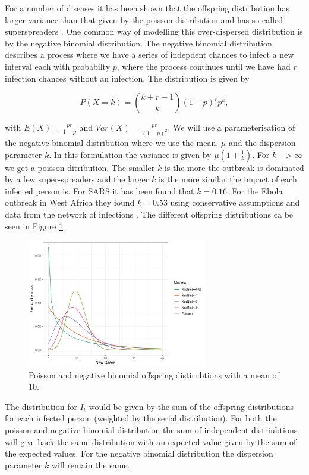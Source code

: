 \documentclass[12pt]{article}
\begin{document}
For a number of diseases it has been shown that the offspring distribution has larger variance than that given by the poisson distribution and has so called superspreaders \cite{lloyd-smithSuperspreadingEffectIndividual2005}. One common way of modelling this over-dispersed distribution is by the negative binomial distribution. The negative binomial distribution describes a process where we have a series of indepdent chances to infect a new interval each with probabilty $p$, where the process continues until we have had $r$ infection chances without an infection. The distribution is given by

\[P(X=k) = {k + r - 1 \choose k} (1-p)^rp^k, \]

with $E(X)=\frac{pr}{1-p}$ and $Var(X) = \frac{pr}{(1-p)^2}$. We will use a parameterisation of the negative binomial distribution where we use the mean, $\mu$ and the dispersion parameter $k$. In this formulation the variance is given by $\mu(1 + \frac{1}{k})$. For $k->\infty$ we get a poisson ditribution. The smaller $k$ is the more the outbreak is dominated by a few super-spreaders and the larger $k$ is the more similar the impact of each infected person is. For SARS it has been found that $k=0.16$\cite{lloyd-smithSuperspreadingEffectIndividual2005}. For the Ebola outbreak in West Africa they found $k=0.53$ using conservative assumptions and data from the network of infections \cite{internationalebolaresponseteamExposurePatternsDriving2016}. The different offspring distributions ca be seen in Figure \ref{fig:offspring}

\begin{figure}[h]
  \centering
  \includegraphics[width=0.7\textwidth]{../output/prob_dist.png}
  \caption{Poisson and negative binomial offspring distirubtions with a mean of 10.}
  \label{fig:offspring}
\end{figure}

The distribution for $I_t$ would be given by the sum of the offspring distributions for each infected person (weighted by the serial distribution). For both the poisson and negative binomial distribution the sum of independent distriubtions will give back the same distribution with an expected value given by the sum of the expected values. For the negative binomial distribution the dispersion parameter $k$ will remain the same. 
\end{document}

